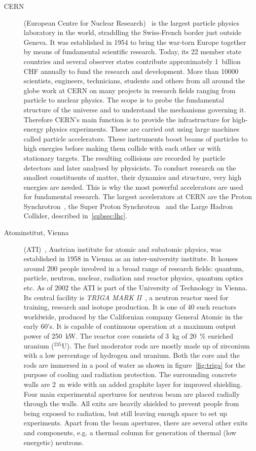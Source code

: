 \begin{description}
\item[CERN] (European Centre for Nuclear Research)~\cite{CERN:00000} is the largest particle physics laboratory in the world, straddling the Swiss-French border just outside Geneva. It was established in 1954 to bring the war-torn Europe together by means of fundamental scientific research. Today, its 22 member state countries and several observer states contribute approximately 1~billion CHF annually to fund the research and development. More than 10000 scientists, engineers, technicians, students and others from all around the globe work at CERN on many projects in research fields ranging from particle to nuclear physics. The scope is to probe the fundamental structure of the universe and to understand the mechanisms governing it. Therefore CERN's main function is to provide the infrastructure for high-energy physics experiments. These are carried out using large machines called particle accelerators. These instruments boost beams of particles to high energies before making them collide with each other or with stationary targets. The resulting collisions are recorded by particle detectors and later analysed by physicists. To conduct research on the smallest constituents of matter, their dynamics and structure, very high energies are needed. This is why the most powerful accelerators are used for fundamental research. The largest accelerators at CERN are the Proton Synchrotron~\cite{Regenstreif:342915}, the Super Proton Synchrotron~\cite{Mills:133232} and the Large Hadron Collider, described in~\ref{subsec:lhc}.


\item[Atominstitut, Vienna] (ATI)~\cite{AtomInst:00000}, Austrian institute for atomic and subatomic physics, was established in 1958 in Vienna as an inter-university institute. It houses around 200 people involved in a broad range of research fields: quantum, particle, neutron, nuclear, radiation and reactor physics, quantum optics etc. As of 2002 the ATI is part of the University of Technology in Vienna.
Its central facility is \emph{TRIGA MARK II}~\cite{Triga:00000}, a neutron reactor used for training, research and isotope production. It is one of 40 such reactors worldwide, produced by the Californian company General Atomic in the early 60's. It is capable of continuous operation at a maximum output power of 250~kW. 
The reactor core consists of 3~kg of 20~\% enriched uranium ($^{235}$U). The fuel moderator rods are mostly made up of zirconium with a low percentage of hydrogen and uranium. Both the core and the rods are immersed in a pool of water as shown in figure~\ref{fig:triga} for the purpose of cooling and radiation protection. The surrounding concrete walls are 2~m wide with an added graphite layer for improved shielding. Four main experimental apertures for neutron beam are placed radially through the walls. All exits are heavily shielded to prevent people from being exposed to radiation, but still leaving enough space to set up experiments. Apart from the beam apertures, there are several other exits and components, e.g. a thermal column for generation of thermal (low energetic) neutrons.







\end{description}
